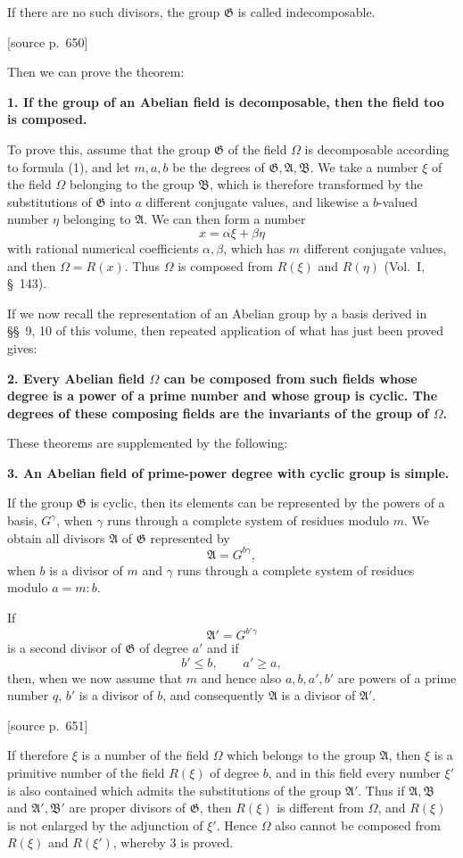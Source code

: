 \documentclass[11pt]{article}
\newcommand{\Om}{\Omega}
\newcommand{\Gg}{\mathfrak G}
\newcommand{\Aa}{\mathfrak A}
\newcommand{\Bb}{\mathfrak B}
\newcommand{\srcpage}[1]{\par\medskip\noindent\textsf{[source p.~#1]}\par\smallskip}
\begin{document}
If there are no such divisors, the group $\Gg$ is called indecomposable.

\srcpage{650}
Then we can prove the theorem:

\textbf{1. If the group of an Abelian field is decomposable, then the field too is composed.}

To prove this, assume that the group $\Gg$ of the field $\Om$ is decomposable according to formula (1), and let $m,a,b$ be the degrees of $\Gg,\Aa,\Bb$. We take a number $\xi$ of the field $\Om$ belonging to the group $\Bb$, which is therefore transformed by the substitutions of $\Gg$ into $a$ different conjugate values, and likewise a $b$-valued number $\eta$ belonging to $\Aa$. We can then form a number
\[
  x=\alpha\xi+\beta\eta
\]
with rational numerical coefficients $\alpha,\beta$, which has $m$ different conjugate values, and then $\Om=R(x)$. Thus $\Om$ is composed from $R(\xi)$ and $R(\eta)$ (Vol.~I, \S~143).

If we now recall the representation of an Abelian group by a basis derived in \S\S~9, 10 of this volume, then repeated application of what has just been proved gives:

\textbf{2. Every Abelian field $\Om$ can be composed from such fields whose degree is a power of a prime number and whose group is cyclic. The degrees of these composing fields are the invariants of the group of $\Om$.}

These theorems are supplemented by the following:

\textbf{3. An Abelian field of prime-power degree with cyclic group is simple.}

If the group $\Gg$ is cyclic, then its elements can be represented by the powers of a basis, $G^\gamma$, when $\gamma$ runs through a complete system of residues modulo $m$. We obtain all divisors $\Aa$ of $\Gg$ represented by
\[
  \Aa=G^{b\gamma},
\]
when $b$ is a divisor of $m$ and $\gamma$ runs through a complete system of residues modulo $a=m:b$.

If
\[
  \Aa'=G^{b'\gamma}
\]
is a second divisor of $\Gg$ of degree $a'$ and if
\[
  b'\le b,
  \qquad a'\ge a,
\]
then, when we now assume that $m$ and hence also $a,b,a',b'$ are powers of a prime number $q$, $b'$ is a divisor of $b$, and consequently $\Aa$ is a divisor of $\Aa'$.

\srcpage{651}
If therefore $\xi$ is a number of the field $\Om$ which belongs to the group $\Aa$, then $\xi$ is a primitive number of the field $R(\xi)$ of degree $b$, and in this field every number $\xi'$ is also contained which admits the substitutions of the group $\Aa'$. Thus if $\Aa,\Bb$ and $\Aa',\Bb'$ are proper divisors of $\Gg$, then $R(\xi)$ is different from $\Om$, and $R(\xi)$ is not enlarged by the adjunction of $\xi'$. Hence $\Om$ also cannot be composed from $R(\xi)$ and $R(\xi')$, whereby 3 is proved.
\end{document}
